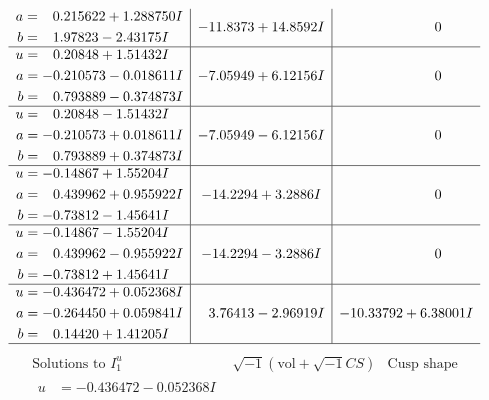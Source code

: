 \documentclass[1p]{elsarticle_modified}
\theoremstyle{definition}
\newcommand{\I}{\sqrt{-1}}
\begin{document}
$$\begin{array}{c|c|c}
\begin{aligned}
a &= \phantom{-}0.215622 + 1.288750 I \\
b &= \phantom{-}1.97823 - 2.43175 I\end{aligned}
 & -11.8373 + 14.8592 I & \phantom{-0.000000 } 0 \\ \hline\begin{aligned}
u &= \phantom{-}0.20848 + 1.51432 I \\
a &= -0.210573 - 0.018611 I \\
b &= \phantom{-}0.793889 - 0.374873 I\end{aligned}
 & -7.05949 + 6.12156 I & \phantom{-0.000000 } 0 \\ \hline\begin{aligned}
u &= \phantom{-}0.20848 - 1.51432 I \\
a &= -0.210573 + 0.018611 I \\
b &= \phantom{-}0.793889 + 0.374873 I\end{aligned}
 & -7.05949 - 6.12156 I & \phantom{-0.000000 } 0 \\ \hline\begin{aligned}
u &= -0.14867 + 1.55204 I \\
a &= \phantom{-}0.439962 + 0.955922 I \\
b &= -0.73812 - 1.45641 I\end{aligned}
 & -14.2294 + 3.2886 I & \phantom{-0.000000 } 0 \\ \hline\begin{aligned}
u &= -0.14867 - 1.55204 I \\
a &= \phantom{-}0.439962 - 0.955922 I \\
b &= -0.73812 + 1.45641 I\end{aligned}
 & -14.2294 - 3.2886 I & \phantom{-0.000000 } 0 \\ \hline\begin{aligned}
u &= -0.436472 + 0.052368 I \\
a &= -0.264450 + 0.059841 I \\
b &= \phantom{-}0.14420 + 1.41205 I\end{aligned}
 & \phantom{-}3.76413 - 2.96919 I & -10.33792 + 6.38001 I\\
 \hline 
 \end{array}$$\newpage$$\begin{array}{c|c|c}  
\text{Solutions to }I^u_{1}& \I (\text{vol} + \sqrt{-1}CS) & \text{Cusp shape}\\
 \hline 
\begin{aligned}
u &= -0.436472 - 0.052368 I \\

\end{aligned}
\end{array}$$
\end{document}
